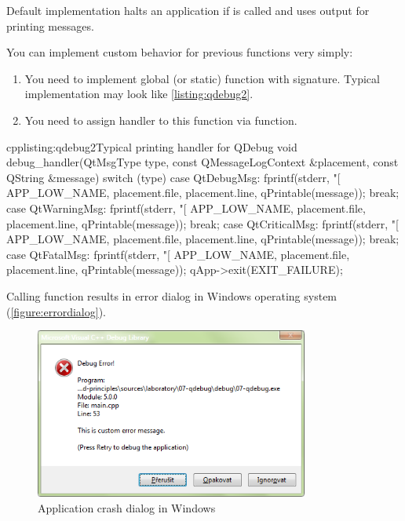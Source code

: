 Default implementation halts an application if is called and uses output for printing messages.

You can implement custom behavior for previous functions very simply:
\begin{enumerate}
\item
You need to implement global (or static) function with signature. Typical\\ implementation may look like \autoref{listing:qdebug2}.

\item
You need to assign handler to this function via function.
\end{enumerate}

\begin{fdoccode}{cpp}{listing:qdebug2}{Typical printing handler for QDebug}
void debug_handler(QtMsgType type, const QMessageLogContext &placement, const QString &message) {
    switch (type) {
	case QtDebugMsg:
	    fprintf(stderr, "[%
		    APP_LOW_NAME,
		    placement.file,
		    placement.line,
		    qPrintable(message));
	    break;
	case QtWarningMsg:
	    fprintf(stderr, "[%
		    APP_LOW_NAME,
		    placement.file,
		    placement.line,
		    qPrintable(message));
	    break;
	case QtCriticalMsg:
	    fprintf(stderr, "[%
		    APP_LOW_NAME,
		    placement.file,
		    placement.line,
		    qPrintable(message));
	    break;
	case QtFatalMsg:
	    fprintf(stderr, "[%
		    APP_LOW_NAME,
		    placement.file,
		    placement.line,
		    qPrintable(message));
	    qApp->exit(EXIT_FAILURE);
    }
}
\end{fdoccode}

Calling function results in error dialog in Windows operating system (\autoref{figure:errordialog}).

\begin{figure}[ht]
\centering\includegraphics[width=9cm]{graphics/laboratory/11-debugdialog.png}
\caption{Application crash dialog in Windows}\label{figure:errordialog}
\end{figure}

